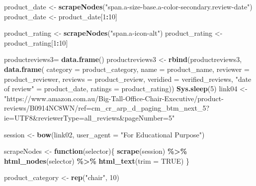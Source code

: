 \documentclass[
]{article}
\newenvironment{Shaded}{\begin{snugshade}}{\end{snugshade}}
\newcommand{\AttributeTok}[1]{\textcolor[rgb]{0.13,0.29,0.53}{#1}}
\newcommand{\ConstantTok}[1]{\textcolor[rgb]{0.56,0.35,0.01}{#1}}
\newcommand{\ControlFlowTok}[1]{\textcolor[rgb]{0.13,0.29,0.53}{\textbf{#1}}}
\newcommand{\DecValTok}[1]{\textcolor[rgb]{0.00,0.00,0.81}{#1}}
\newcommand{\FunctionTok}[1]{\textcolor[rgb]{0.13,0.29,0.53}{\textbf{#1}}}
\newcommand{\NormalTok}[1]{#1}
\newcommand{\OtherTok}[1]{\textcolor[rgb]{0.56,0.35,0.01}{#1}}
\newcommand{\SpecialCharTok}[1]{\textcolor[rgb]{0.81,0.36,0.00}{\textbf{#1}}}
\newcommand{\StringTok}[1]{\textcolor[rgb]{0.31,0.60,0.02}{#1}}
\begin{document}
\begin{Shaded}
\begin{Highlighting}[]
\NormalTok{  product\_date }\OtherTok{\textless{}{-}} \FunctionTok{scrapeNodes}\NormalTok{(}\StringTok{"span.a{-}size{-}base.a{-}color{-}secondary.review{-}date"}\NormalTok{)}
\NormalTok{  product\_date }\OtherTok{\textless{}{-}}\NormalTok{ product\_date[}\DecValTok{1}\SpecialCharTok{:}\DecValTok{10}\NormalTok{]}
  
\NormalTok{  product\_rating }\OtherTok{\textless{}{-}} \FunctionTok{scrapeNodes}\NormalTok{(}\StringTok{"span.a{-}icon{-}alt"}\NormalTok{)}
\NormalTok{  product\_rating }\OtherTok{\textless{}{-}}\NormalTok{ product\_rating[}\DecValTok{1}\SpecialCharTok{:}\DecValTok{10}\NormalTok{]}
  
\NormalTok{  productreviews3}\OtherTok{=} \FunctionTok{data.frame}\NormalTok{()}
\NormalTok{  productreviews3 }\OtherTok{\textless{}{-}} \FunctionTok{rbind}\NormalTok{(productreviews3, }\FunctionTok{data.frame}\NormalTok{(}
                      \AttributeTok{category =}\NormalTok{ product\_category,}
                      \AttributeTok{name =}\NormalTok{ product\_name,}
                      \AttributeTok{reviewer =}\NormalTok{ product\_reviewer,}
                      \AttributeTok{reviews =}\NormalTok{ product\_review,}
                      \AttributeTok{veridied =}\NormalTok{ verified\_reviews,}
                      \StringTok{"date of review"} \OtherTok{=}\NormalTok{ product\_date,}
                      \AttributeTok{ratings =}\NormalTok{ product\_rating))}
   \FunctionTok{Sys.sleep}\NormalTok{(}\DecValTok{5}\NormalTok{)}
\NormalTok{link04 }\OtherTok{\textless{}{-}} \StringTok{"https://www.amazon.com.au/Big{-}Tall{-}Office{-}Chair{-}Executive/product{-}reviews/B0914NC8WN/ref=cm\_cr\_arp\_d\_paging\_btm\_next\_5?ie=UTF8\&reviewerType=all\_reviews\&pageNumber=5"}


\NormalTok{  session }\OtherTok{\textless{}{-}} \FunctionTok{bow}\NormalTok{(link02,}
               \AttributeTok{user\_agent =} \StringTok{"For Educational Purpose"}\NormalTok{)}

\NormalTok{  scrapeNodes }\OtherTok{\textless{}{-}} \ControlFlowTok{function}\NormalTok{(selector)\{}
    \FunctionTok{scrape}\NormalTok{(session) }\SpecialCharTok{\%\textgreater{}\%}
      \FunctionTok{html\_nodes}\NormalTok{(selector) }\SpecialCharTok{\%\textgreater{}\%}
      \FunctionTok{html\_text}\NormalTok{(}\AttributeTok{trim =} \ConstantTok{TRUE}\NormalTok{)}
\NormalTok{  \}}

\NormalTok{  product\_category }\OtherTok{\textless{}{-}} \FunctionTok{rep}\NormalTok{(}\StringTok{"chair"}\NormalTok{, }\DecValTok{10}\NormalTok{)}


\end{Highlighting}
\end{Shaded}
\end{document}
